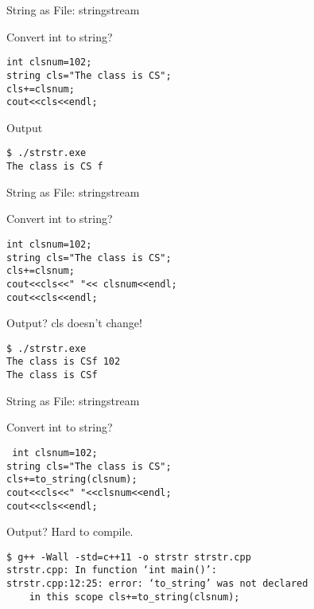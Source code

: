 \documentclass[xcolor={dvipsnames}]{beamer}
\begin{document}
\begin{frame}[fragile]{String as File: stringstream}
\begin{block}{Convert int to string?}
\begin{verbatim}
int clsnum=102;
string cls="The class is CS";
cls+=clsnum;
cout<<cls<<endl;
\end{verbatim}
\end{block}

\begin{block}{Output}
\begin{verbatim}
$ ./strstr.exe
The class is CS f
\end{verbatim}
\end{block}
\end{frame}

\begin{frame}[fragile]{String as File: stringstream}
\begin{block}{Convert int to string?}
\begin{verbatim}
int clsnum=102;
string cls="The class is CS";
cls+=clsnum;
cout<<cls<<" "<< clsnum<<endl;
cout<<cls<<endl;
\end{verbatim}
\end{block}

\begin{block}{Output? cls doesn't change!}
\begin{verbatim}
$ ./strstr.exe
The class is CSf 102
The class is CSf
\end{verbatim}
\end{block}
\end{frame}

\begin{frame}[fragile]{String as File: stringstream}
\begin{block}{Convert int to string?}
\begin{verbatim}
 int clsnum=102;
string cls="The class is CS";
cls+=to_string(clsnum);
cout<<cls<<" "<<clsnum<<endl;
cout<<cls<<endl;
\end{verbatim}
\end{block}

\begin{block}{Output? Hard to compile.}
\begin{verbatim}
$ g++ -Wall -std=c++11 -o strstr strstr.cpp
strstr.cpp: In function ‘int main()’:
strstr.cpp:12:25: error: ‘to_string’ was not declared 
    in this scope cls+=to_string(clsnum);
\end{verbatim}
\end{block}
\end{frame}
\end{document}
